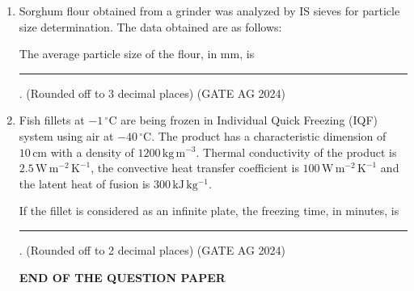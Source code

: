 \documentclass[journal]{IEEEtran}
\begin{document}
\begin{enumerate}
\medskip

\item
Sorghum flour obtained from a grinder was analyzed by IS sieves for particle size determination. The data obtained are as follows:



The average particle size of the flour, in mm, is \rule{3cm}{0.2pt}. (Rounded off to 3 decimal places)
 \hfill(GATE AG 2024)\\

 \medskip

\item
Fish fillets at $-1\,^\circ\mathrm{C}$ are being frozen in Individual Quick Freezing (IQF) system using air at $-40\,^\circ\mathrm{C}$. The product has a characteristic dimension of $10\,\mathrm{cm}$ with a density of $1200\,\mathrm{kg\,m^{-3}}$. Thermal conductivity of the product is $2.5\,\mathrm{W\,m^{-2}\,K^{-1}}$, the convective heat transfer coefficient is $100\,\mathrm{W\,m^{-2}\,K^{-1}}$ and the latent heat of fusion is $300\,\mathrm{kJ\,kg^{-1}}$.

If the fillet is considered as an infinite plate, the freezing time, in minutes, is \rule{3cm}{0.2pt}. (Rounded off to 2 decimal places)
 \hfill(GATE AG 2024)\\

\medskip

\begin{center}
\textbf{END OF THE QUESTION PAPER}
\end{center}

\end{enumerate}
\end{document}
